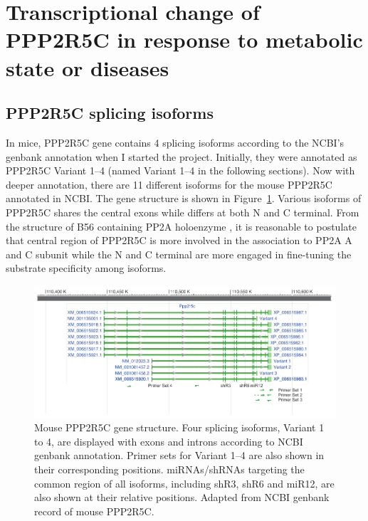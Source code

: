 
\section[Transcriptional change of PPP2R5C]{Transcriptional change of PPP2R5C in response to metabolic state or diseases}

\subsection{PPP2R5C splicing isoforms}

In mice, PPP2R5C gene contains 4 splicing isoforms  according to the NCBI's genbank annotation when I started the project. Initially, they were annotated as PPP2R5C Variant 1--4 (named Variant 1--4 in the following sections). Now with deeper annotation, there are 11 different isoforms for the mouse PPP2R5C annotated in NCBI. The gene structure is shown in Figure~\ref{fig:fig2.0}. Various isoforms of PPP2R5C shares the central exons while differs at both N and C terminal. From the structure of B56 containing PP2A holoenzyme \cite{cho_crystal_2007,xing_structure_2006}, it is reasonable to postulate that central region of PPP2R5C is more involved in the association to PP2A A and C subunit while the N and C terminal are more engaged in fine-tuning the substrate specificity among isoforms. 

\begin{figure}[htbp]
\centering
\includegraphics[width=1\textwidth]{figs/fig2-0 ppp2r5c gene structure.pdf}
\caption[Mouse PPP2R5C gene structure]{\footnotesize Mouse PPP2R5C gene structure. Four splicing isoforms, Variant 1 to 4, are displayed with exons and introns according to NCBI genbank annotation. Primer sets for Variant 1--4 are also shown in their corresponding positions. miRNAs/shRNAs targeting the common region of all isoforms, including shR3, shR6 and miR12, are also shown at their relative positions. Adapted from NCBI genbank record of mouse PPP2R5C.}
\label{fig:fig2.0}
\end{figure}

